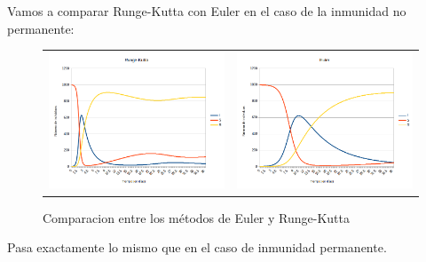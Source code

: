 \documentclass[11pt,a4paper]{report}
\begin{document}
Vamos a comparar Runge-Kutta con Euler en el caso de la inmunidad no permanente:

\begin{figure}[H]
\begin{tabular}{ll}
\includegraphics[scale=0.25]{img/sin_inmunidad/runge-kutta.png}
&
\includegraphics[scale=0.25]{img/sin_inmunidad/euler.png}
\end{tabular}
\caption{Comparacion entre los métodos de Euler y Runge-Kutta}
\end{figure}

Pasa exactamente lo mismo que en el caso de inmunidad permanente.
\end{document}
